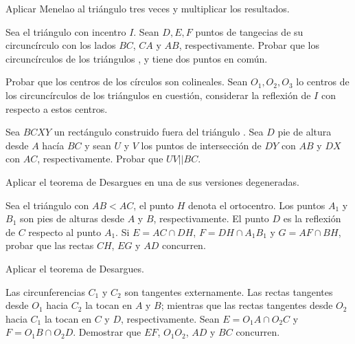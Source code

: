 \begin{hint}
    Aplicar Menelao al triángulo  tres veces y multiplicar los resultados.
\end{hint}


\begin{section-problem}
    Sea el triángulo  con incentro $I$.
    Sean $D, E, F$ puntos de tangecias de su circuncírculo con los lados $BC$, $CA$ y $AB$, respectivamente.
    Probar que los circuncírculos de los triángulos ,  y  tiene dos puntos en común.
\end{section-problem}

\begin{hint}
    Probar que los centros de los círculos son colineales.
    Sean $O_1, O_2, O_3$ lo centros de los circuncírculos de los triángulos en cuestión, considerar la reflexión de $I$ con respecto a estos centros.
\end{hint}


\begin{section-problem}
    Sea $BCXY$ un rectángulo construido fuera del triángulo .
    Sea $D$ pie de altura desde $A$ hacía $BC$ y sean $U$ y $V$ los puntos de intersección de $DY$ con $AB$ y $DX$ con $AC$, respectivamente.
    Probar que $UV || BC$.
\end{section-problem}

\begin{hint}
    Aplicar el teorema de Desargues en una de sus versiones degeneradas.
\end{hint}

\begin{section-problem}
    Sea el triángulo  con $AB < AC$, el punto $H$ denota el ortocentro.
    Los puntos $A_1$ y $B_1$ son pies de alturas desde $A$ y $B$, respectivamente.
    El punto $D$ es la reflexión de $C$ respecto al punto $A_1$.
    Si $E = AC \cap DH$, $F = DH \cap A_1 B_1$ y $G = AF \cap BH$, probar que las rectas $CH$, $EG$ y $AD$ concurren.
\end{section-problem}

\begin{hint}
    Aplicar el teorema de Desargues.
\end{hint}


\begin{section-problem}
    Las circunferencias $C_1$ y $C_2$ son tangentes externamente.
    Las rectas tangentes desde $O_1$ hacia $C_2$ la tocan en $A$ y $B$; mientras que las rectas tangentes desde $O_2$ hacia $C_1$ la tocan en $C$ y $D$, respectivamente.
    Sean $E = O_1 A \cap O_2 C$ y $F = O_1 B \cap O_2 D$.
    Demostrar que $EF$, $O_1 O_2$, $AD$ y $BC$ concurren.
\end{section-problem}

